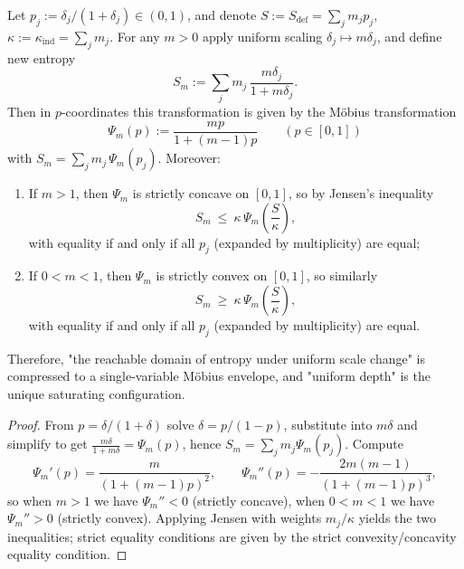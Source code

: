 \begin{proposition}\label{prop:xi-defect-entropy-uniform-scaling-jensen-envelope}
Let
\(
p_j:=\delta_j/(1+\delta_j)\in(0,1)
\), and denote
\(
S:=S_{\mathrm{def}}=\sum_j m_j p_j
\),
\(
\kappa:=\kappa_{\mathrm{ind}}=\sum_j m_j
\).
For any \(m>0\) apply uniform scaling \(\delta_j\mapsto m\delta_j\), and define new entropy
\[
S_m:=\sum_j m_j\,\frac{m\delta_j}{1+m\delta_j}.
\]
Then in \(p\)-coordinates this transformation is given by the Möbius transformation
\begin{equation}\label{eq:xi-defect-entropy-scaling-mobius}
\boxed{\;
\Psi_m(p):=\frac{mp}{1+(m-1)p}\qquad(p\in[0,1])\;}
\end{equation}
with \(S_m=\sum_j m_j\,\Psi_m(p_j)\).
Moreover:
\begin{enumerate}
  \item If \(m>1\), then \(\Psi_m\) is strictly concave on \([0,1]\), so by Jensen's inequality
  \[
  \boxed{\;
  S_m\ \le\ \kappa\,\Psi_m\!\left(\frac{S}{\kappa}\right),\;}
  \]
  with equality if and only if all \(p_j\) (expanded by multiplicity) are equal;
  \item If \(0<m<1\), then \(\Psi_m\) is strictly convex on \([0,1]\), so similarly
  \[
  \boxed{\;
  S_m\ \ge\ \kappa\,\Psi_m\!\left(\frac{S}{\kappa}\right),\;}
  \]
  with equality if and only if all \(p_j\) (expanded by multiplicity) are equal.
\end{enumerate}
Therefore, "the reachable domain of entropy under uniform scale change" is compressed to a single-variable Möbius envelope, and "uniform depth" is the unique saturating configuration.
\end{proposition}

\begin{proof}
From \(p=\delta/(1+\delta)\) solve \(\delta=p/(1-p)\), substitute into \(m\delta\) and simplify to get
\(\frac{m\delta}{1+m\delta}=\Psi_m(p)\), hence \(S_m=\sum_j m_j\Psi_m(p_j)\).
Compute
\[
\Psi_m'(p)=\frac{m}{(1+(m-1)p)^2},
\qquad
\Psi_m''(p)=-\frac{2m(m-1)}{(1+(m-1)p)^3},
\]
so when \(m>1\) we have \(\Psi_m''<0\) (strictly concave), when \(0<m<1\) we have \(\Psi_m''>0\) (strictly convex).
Applying Jensen with weights \(m_j/\kappa\) yields the two inequalities; strict equality conditions are given by the strict convexity/concavity equality condition.
\end{proof}

